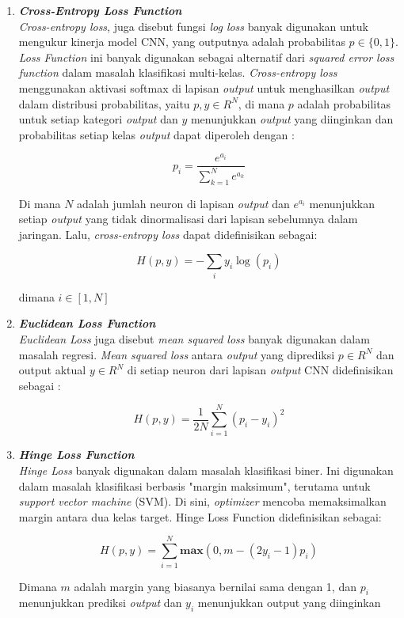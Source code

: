 \begin{enumerate}
	\item \textit{\textbf{Cross-Entropy Loss Function}}\\
	\textit{Cross-entropy loss}, juga disebut fungsi \textit{log loss} banyak digunakan untuk mengukur kinerja model CNN, yang outputnya adalah probabilitas $p \in \{0,1\}$. \textit{Loss Function} ini banyak digunakan sebagai alternatif dari \textit{squared error loss function} dalam masalah klasifikasi multi-kelas. \textit{Cross-entropy loss} menggunakan aktivasi softmax di lapisan \textit{output} untuk menghasilkan \textit{output} dalam distribusi probabilitas, yaitu $p, y \in R^N$, di mana $p$ adalah probabilitas untuk setiap kategori \textit{output} dan $y$ menunjukkan \textit{output} yang diinginkan dan probabilitas setiap kelas \textit{output} dapat diperoleh dengan : 
	
	\begin{equation}
		p_i = \frac{e^{a_i}}{\sum_{k=1}^{N} e^{a_k}}
	\end{equation}
	
	Di mana $N$ adalah jumlah neuron di lapisan \textit{output} dan $e^{a_i}$ menunjukkan setiap \textit{output} yang tidak dinormalisasi dari lapisan sebelumnya dalam jaringan. Lalu, \textit{cross-entropy loss} dapat didefinisikan sebagai:
	
	\begin{equation}
		H(p,y) =-\sum_{i} y_i\log(p_i)
	\end{equation}
	\begin{center}
		dimana $i \in \left[1,N\right]$
	\end{center}
	
	\item \textbf{\textit{Euclidean Loss Function}}\\
	\textit{Euclidean Loss} juga disebut \textit{mean squared loss }banyak digunakan dalam masalah regresi. \textit{Mean squared loss} antara \textit{output} yang diprediksi $p \in R^N$ dan output aktual $y \in R^N$ di setiap neuron dari lapisan \textit{output} CNN didefinisikan sebagai :
	
	\begin{equation}
		H(p,y)=\frac{1}{2N} \sum_{i=1}^{N} (p_i-y_i)^2
	\end{equation}
	
	\item \textit{\textbf{Hinge Loss Function}}\\
	\textit{Hinge Loss} banyak digunakan dalam masalah klasifikasi biner. Ini digunakan dalam masalah klasifikasi berbasis "margin maksimum", terutama untuk \textit{support vector machine} (SVM). Di sini, \textit{optimizer} mencoba memaksimalkan margin antara dua kelas target. Hinge Loss Function didefinisikan sebagai:
	
	\begin{equation}
		H(p,y) = \sum_{i=1}^{N} \textbf{max}(0, m-(2y_i - 1)p_i)
	\end{equation}

	Dimana $m$ adalah margin yang biasanya bernilai sama dengan 1, dan $p_i$ menunjukkan prediksi \textit{output} dan $y_i$ menunjukkan output yang diinginkan
		
\end{enumerate}

